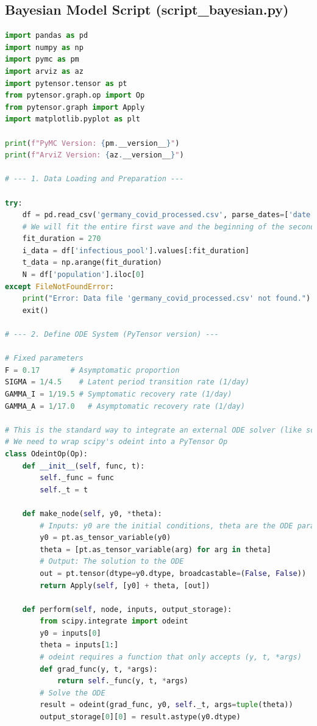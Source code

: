 \documentclass[12pt, a4paper]{article}
\begin{document}
\subsection{Bayesian Model Script (script\_bayesian.py)}
\begin{lstlisting}[language=Python, caption=Python script for constructing and sampling the Bayesian SEIAR model using PyMC.]
import pandas as pd
import numpy as np
import pymc as pm
import arviz as az
import pytensor.tensor as pt
from pytensor.graph.op import Op
from pytensor.graph import Apply
import matplotlib.pyplot as plt

print(f"PyMC Version: {pm.__version__}")
print(f"ArviZ Version: {az.__version__}")

# --- 1. Data Loading and Preparation ---

try:
    df = pd.read_csv('germany_covid_processed.csv', parse_dates=['date'])
    # We will fit the entire first wave and the beginning of the second wave (approx. 9 months)
    fit_duration = 270 
    i_data = df['infectious_pool'].values[:fit_duration]
    t_data = np.arange(fit_duration)
    N = df['population'].iloc[0]
except FileNotFoundError:
    print("Error: Data file 'germany_covid_processed.csv' not found.")
    exit()

# --- 2. Define ODE System (PyTensor version) ---

# Fixed parameters
F = 0.17       # Asymptomatic proportion
SIGMA = 1/4.5    # Latent period transition rate (1/day)
GAMMA_I = 1/19.5 # Symptomatic recovery rate (1/day)
GAMMA_A = 1/17.0   # Asymptomatic recovery rate (1/day)

# This is the standard way to integrate an external ODE solver (like scipy) in PyMC v5+
# We need to wrap scipy's odeint into a PyTensor Op
class OdeintOp(Op):
    def __init__(self, func, t):
        self._func = func
        self._t = t

    def make_node(self, y0, *theta):
        # Inputs: y0 are the initial conditions, theta are the ODE parameters
        y0 = pt.as_tensor_variable(y0)
        theta = [pt.as_tensor_variable(arg) for arg in theta]
        # Output: The solution to the ODE
        out = pt.tensor(dtype=y0.dtype, broadcastable=(False, False))
        return Apply(self, [y0] + theta, [out])

    def perform(self, node, inputs, output_storage):
        from scipy.integrate import odeint
        y0 = inputs[0]
        theta = inputs[1:]
        # odeint requires a function that only accepts (y, t, *args)
        def grad_func(y, t, *args):
            return self._func(y, t, *args)
        # Solve the ODE
        result = odeint(grad_func, y0, self._t, args=tuple(theta))
        output_storage[0][0] = result.astype(y0.dtype)


\end{lstlisting}
\end{document}
